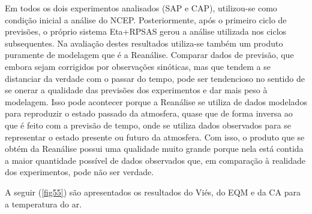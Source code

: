 Em todos os dois experimentos analisados (SAP e CAP), utilizou-se como condição inicial a análise do NCEP. Posteriormente, após o primeiro ciclo de previsões, o próprio sistema Eta+RPSAS gerou a análise utilizada nos ciclos subsequentes. Na avaliação destes resultados utiliza-se também um produto puramente de modelagem que é a Reanálise. Comparar dados de previsão, que embora sejam corrigidos por observações sinóticas, mas que tendem a se distanciar da verdade com o passar do tempo, pode ser tendencioso no sentido de se onerar a qualidade das previsões dos experimentos e dar mais peso à modelagem. Isso pode acontecer porque a Reanálise se utiliza de dados modelados para reproduzir o estado passado da atmosfera, quase que de forma inversa ao que é feito com a previsão de tempo, onde se utiliza dados observados para se representar o estado presente ou futuro da atmosfera. Com isso, o produto que se obtém da Reanálise possui uma qualidade muito grande porque nela está contida a maior quantidade possível de dados observados que, em comparação à realidade dos experimentos, pode não ser verdade.

A seguir (\autoref{fig55}) são apresentados os resultados do Viés, do EQM e da CA para a temperatura do ar.

